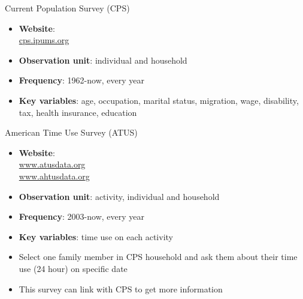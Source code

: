 \documentclass[hyperref={pdfpagelabels=false}]{beamer}
\begin{document}
\begin{frame}{Current Population Survey (CPS)}
\begin{itemize} 
\item \textbf{Website}: \\ \href{https://cps.ipums.org/cps}{cps.ipums.org} 
\vspace{0.2cm}
\item \textbf{Observation unit}: individual and household
\vspace{0.2cm}
\item \textbf{Frequency}: 1962-now, every year 
\vspace{0.2cm}
\item \textbf{Key variables}: age, occupation, marital status, migration, wage, disability, tax, health insurance, education



\end{itemize}
\end{frame}



\begin{frame}{American Time Use Survey (ATUS)}
\begin{itemize} 
\item \textbf{Website}:  \\ \href{https://www.atusdata.org/atus}{www.atusdata.org}  \\ \href{https://www.ahtusdata.org/ahtus}{www.ahtusdata.org} 
\vspace{0.2cm}
\item \textbf{Observation unit}: activity, individual and household
\vspace{0.2cm}
\item \textbf{Frequency}: 2003-now, every year 
\vspace{0.2cm}
\item \textbf{Key variables}: time use on each activity
\vspace{0.2cm}
\item Select one family member in CPS household and ask them about their time use (24 hour) on specific date
\vspace{0.2cm}
\item This survey can link with CPS to get more information

\end{itemize}
\end{frame}
\end{document}
